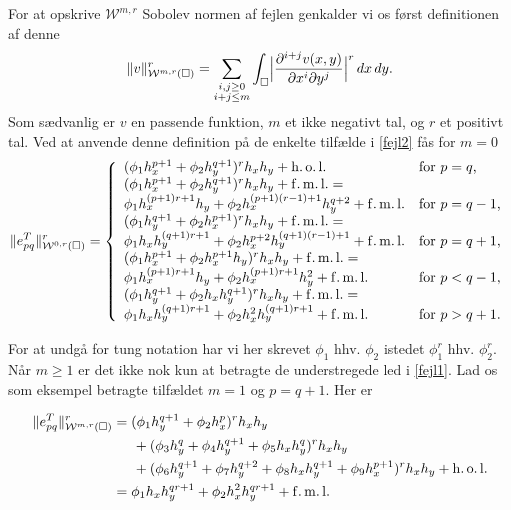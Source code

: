 For at opskrive ${\mathcal W}^{m,r}$ Sobolev normen af fejlen
genkalder vi os først definitionen af denne
\begin{equation} \label{sobolevnorm}
  \|v\|_{{\mathcal W}^{m,r}(\Box)}^r = \sum_{\substack{ i,j\geq 0 \\ i+j \leq m}} \int_\Box
  \Bigl| \frac{\partial^{i+j} v(x,y)}{\partial x^i \partial y^j} \Bigr|^r\, dx\, dy.
\end{equation}
Som sædvanlig er $v$ en passende funktion, $m$ et ikke negativt tal,
og $r$ et positivt tal. Ved at anvende denne definition på de enkelte
tilfælde i \eqref{fejl2} fås for $m=0$
\begin{equation} \label{fejl3}
  \|e_{pq}^T\|_{{\mathcal W}^{0,r}(\Box)}^r =
  \left\{
  \begin{array}{ll}
  (\phi_1 h_x^{p+1} + \phi_2 h_y^{q+1})^r h_x h_y + \operatorname{h.o.l.} &
    \mbox{for $p=q$,} \\
  (\phi_1 h_x^{p+1} + \phi_2 h_y^{q+1})^rh_xh_y + \operatorname{f.m.l.} = & \\
  \phi_1 h_x^{(p+1)r+1} h_y + \phi_2 h_x^{(p+1)(r-1)+1} h_y^{q+2} +\operatorname{f.m.l.} &
    \mbox{for $p=q-1$,} \\
  (\phi_1 h_y^{q+1} + \phi_2 h_x^{p+1})^r h_x h_y +\operatorname{f.m.l.} = & \\
  \phi_1 h_x h_y^{(q+1)r+1} + \phi_2 h_x^{p+2} h_y^{(q+1)(r-1)+1} +\operatorname{f.m.l.} &
    \mbox{for $p=q+1$,} \\
  (\phi_1 h_x^{p+1} + \phi_2 h_x^{p+1}h_y)^r h_x h_y +\operatorname{f.m.l.} = & \\
  \phi_1 h_x^{(p+1)r+1} h_y + \phi_2 h_x^{(p+1)r+1} h_y^{2}
    +\operatorname{f.m.l.} & \mbox{for $p<q-1$,} \\
  (\phi_1 h_y^{q+1} + \phi_2 h_x h_y^{q+1})^r h_x h_y +\operatorname{f.m.l.} = & \\
  \phi_1 h_x h_y^{(q+1)r+1} + \phi_2 h_x^{2} h_y^{(q+1)r+1}
    +\operatorname{f.m.l.} & \mbox{for $p>q+1$.}
  \end{array}
  \right.
\end{equation}

For at undgå for tung notation har vi her skrevet $\phi_1$ hhv.
$\phi_2$ istedet $\phi_1^r$ hhv. $\phi_2^r$. Når $m\geq 1$ er det ikke
nok kun at betragte de understregede led i \eqref{fejl1}. Lad os som
eksempel betragte tilfældet $m=1$ og $p=q+1$. Her er

\begin{align}
 \|e_{pq}^T\|_{{\mathcal W}^{m,r}(\Box)}^r &= ( \phi_1 h_y^{q+1} + \phi_2 h_x^{p} )^r h_x h_y \\
 &\phantom{= (} + ( \phi_3 h_y^q + \phi_4 h_y^{q+1} +
   \phi_5 h_x h_y^q )^r h_x h_y \notag \\
 &\phantom{= (} + ( \phi_6 h_y^{q+1} + \phi_7 h_y^{q+2} +
   \phi_8 h_x h_y^{q+1} + \phi_9 h_x^{p+1} )^r h_x h_y + \operatorname{h.o.l.} \notag \\
 &= \phi_1 h_x h_y^{qr+1} + \phi_2 h_x^2 h_y^{qr+1} + \operatorname{f.m.l.} \notag
\end{align}

